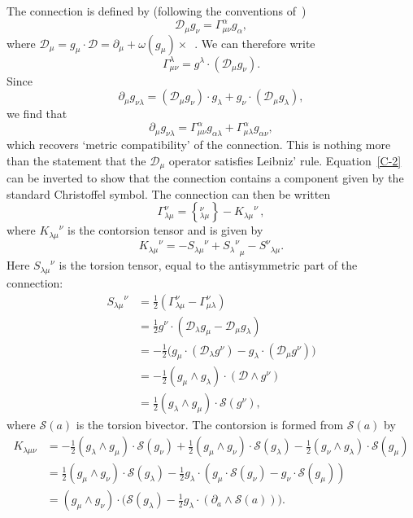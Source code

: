 \documentclass[a4paper]{article}
\numberwithin{equation}{section}
\newcommand{\nn}{\nonumber}
\newcommand{\dt}{\! \cdot \!}
\newcommand{\wdg}{\! \wedge \!}
\newcommand{\half}{{\textstyle \frac{1}{2}}}
\newcommand{\alp}{\alpha}
\newcommand{\lam}{\lambda}
\newcommand{\om}{\omega}
\newcommand{\Gam}{\Gamma}
\newcommand{\cld}{{\mathcal{D}}}
\newcommand{\cls}{{\mathcal{S}}}
\newcommand{\da}{\partial_a}
\begin{document}
The connection is defined by (following the conventions
of~\cite{heh76,nak-geom}) 
%
\begin{equation}
\cld_\mu g_\nu = \Gam^\alp_{\mu \nu} g_\alp,
\end{equation}
%
where $\cld_\mu = g_\mu \dt \cld = \partial_\mu + \om(g_\mu) \times$\ .
We can therefore write
%
\begin{equation}
\Gam^\lam_{\mu \nu} = g^\lam \dt (\cld_\mu g_\nu).
\end{equation}
%
Since
%
\begin{equation}
\partial_\mu g_{\nu \lam} = (\cld_\mu g_\nu) \dt g_\lam + g_\nu \dt
(\cld_\mu g_\lam) ,
\end{equation}
%
we find that
%
\begin{equation}
\partial_\mu g_{\nu \lam} =  \Gam^\alp_{\mu \nu} g_{\alp \lam} +
\Gam^\alp_{\mu \lam} g_{\alp \nu},
\label{C-2}
\end{equation}
%
which recovers `metric compatibility' of the connection.  This is
nothing more than the statement that the $\cld_\mu$ operator satisfies
Leibniz' rule.  Equation~\eqref{C-2} can be inverted to show that the
connection contains a component given by the standard Christoffel
symbol.  The connection can then be written
%
\begin{equation}
\Gam^\nu_{\lam \mu} = \left\{ { }^\nu_{\lam \mu} \right\} - {K_{\lam
\mu}}^\nu \, , 
\end{equation}
%
where ${K_{\lam \mu}}^\nu$ is the contorsion tensor and is given by
%
\begin{equation}
{K_{\lam \mu}}^\nu = - {S_{\lam\mu}}^\nu +{{S_\lam}^\nu}_\mu -
{S^\nu}_{\lam\mu}.
\end{equation}
%
Here ${S_{\lam\mu}}^\nu$ is the torsion tensor, equal to the
antisymmetric part of the connection:
%
\begin{align}
{S_{\lam\mu}}^\nu 
&= \half (\Gam^\nu_{\lam \mu} - \Gam^\nu_{\mu \lam}) \nn \\
&= \half g^\nu \dt (\cld_\lam g_\mu - \cld_\mu g_\lam) \nn \\
&= - \half \bigl(g_\mu \dt (\cld_\lam g^\nu) - g_\lam \dt (\cld_\mu
g^\nu) \bigr)\nn \\
&= - \half (g_\mu \wdg g_\lam) \dt (\cld \wdg g^\nu) \nn \\
&= \half (g_\lam \wdg g_\mu) \dt \cls(g^\nu),
\end{align}
%
where $\cls(a)$ is the torsion bivector.  The contorsion
is formed from $\cls(a)$ by
%
\begin{align}
K_{\lam \mu \nu} 
&= -\half (g_\lam \wdg g_\mu)\dt\cls(g_\nu) +\half(g_\mu \wdg g_\nu)   
\dt\cls(g_\lam)  - \half (g_\nu \wdg g_\lam) \dt \cls(g_\mu) \nn \\
&= \half (g_\mu \wdg g_\nu)\dt\cls(g_\lam) - \half g_\lam \dt
(g_\mu \dt \cls(g_\nu) - g_\nu \dt \cls(g_\mu)) \nn \\
&= (g_\mu \wdg g_\nu) \dt \bigl( \cls(g_\lam) - \half g_\lam \dt (\da \wdg
\cls(a)) \bigr). 
\end{align}
\end{document}
